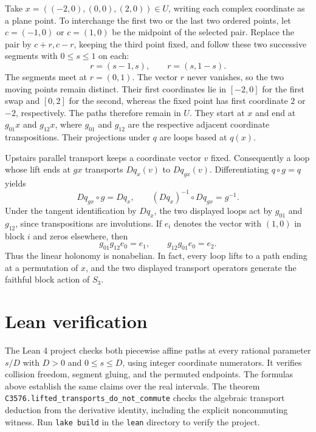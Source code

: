 \documentclass[11pt]{article}
\begin{document}
Take $x=((-2,0),(0,0),(2,0))\in U$, writing each complex coordinate as
a plane point. To interchange the first two or the last two ordered
points, let $c=(-1,0)$ or $c=(1,0)$ be the midpoint of the selected pair.
Replace the pair by $c+r,c-r$, keeping the third point fixed, and follow
these two successive segments with $0\le s\le1$ on each:
\[
 r=(s-1,s),\qquad r=(s,1-s).
\]
The segments meet at $r=(0,1)$. The vector $r$ never vanishes, so the
two moving points remain distinct. Their first coordinates lie in
$[-2,0]$ for the first swap and $[0,2]$ for the second, whereas the
fixed point has first coordinate $2$ or $-2$, respectively. The paths
therefore remain in $U$. They start at $x$ and end at $g_{01}x$ and
$g_{12}x$, where $g_{01}$ and $g_{12}$ are the respective adjacent
coordinate transpositions. Their projections under $q$ are loops
based at $q(x)$.

Upstairs parallel transport keeps a coordinate vector $v$ fixed.
Consequently a loop whose lift ends at $gx$ transports $Dq_x(v)$ to
$Dq_{gx}(v)$. Differentiating $q\circ g=q$ yields
\[
 Dq_{gx}\circ g=Dq_x,
 \qquad (Dq_x)^{-1}\circ Dq_{gx}=g^{-1}.
\]
Under the tangent identification by $Dq_x$, the two displayed loops
act by $g_{01}$ and $g_{12}$, since transpositions are involutions. If
$e_i$ denotes the vector with $(1,0)$ in block $i$ and zeros elsewhere,
then
\[
  g_{01}g_{12}e_0=e_1,\qquad g_{12}g_{01}e_0=e_2.
\]
Thus the linear holonomy is nonabelian. In fact, every loop lifts to a
path ending at a permutation of $x$, and the two displayed transport
operators generate the faithful block action of $S_3$.

\section*{Lean verification}

The Lean 4 project checks both piecewise affine paths at every rational
parameter $s/D$ with $D>0$ and $0\le s\le D$, using integer coordinate
numerators. It verifies collision freedom, segment gluing, and the
permuted endpoints. The formulas above establish the same claims over
the real intervals. The theorem
\texttt{C3576.lifted\_transports\_do\_not\_commute} checks the algebraic
transport deduction from the derivative identity, including the explicit
noncommuting witness. Run \texttt{lake build} in the \texttt{lean}
directory to verify the project.
\end{document}
